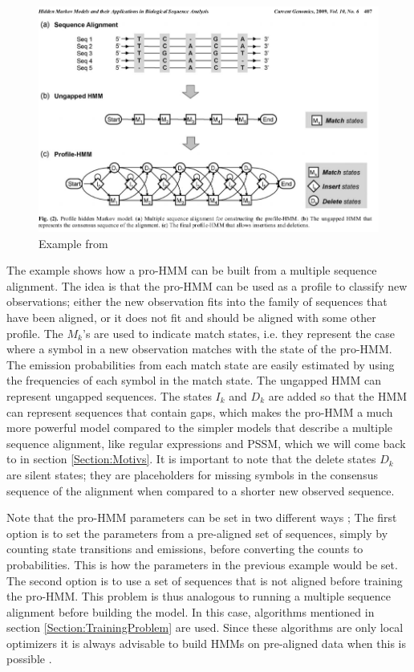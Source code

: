 \documentclass{article}\usepackage[]{graphicx}\usepackage[]{color}
\begin{document}
\begin{figure}
    \centering
    \includegraphics[width = \textwidth]{exampleProfileHMM.png}
    \caption{Example from \cite{Yoon2009}}
    \label{fig:Yoon2009ProfileHMMExample}
\end{figure}

The example shows how a pro-HMM can be built from a multiple sequence alignment. The idea is that the pro-HMM can be used as a profile to classify new observations; either the new observation fits into the family of sequences that have been aligned, or it does not fit and should be aligned with some other profile. The $M_k$'s are used to indicate match states, i.e. they represent the case where a symbol in a new observation matches with the state of the pro-HMM. The emission probabilities from each match state are easily estimated by using the frequencies of each symbol in the match state. The ungapped HMM can represent ungapped sequences. The states $I_k$ and $D_k$ are added so that the HMM can represent sequences that contain gaps, which makes the pro-HMM a much more powerful model compared to the simpler models that describe a multiple sequence alignment, like regular expressions and PSSM, which we will come back to in section \ref{Section:Motivs}. It is important to note that the delete states $D_k$ are silent states; they are placeholders for missing symbols in the consensus sequence of the alignment when compared to a shorter new observed sequence. 

Note that the pro-HMM parameters can be set in two different ways \cite{Eddy1998}; The first option is to set the parameters from a pre-aligned set of sequences, simply by counting state transitions and emissions, before converting the counts to probabilities. This is how the parameters in the previous example would be set. The second option is to use a set of sequences that is not aligned before training the pro-HMM. This problem is thus analogous to running a multiple sequence alignment before building the model. In this case, algorithms mentioned in section \ref{Section:TrainingProblem} are used. Since these algorithms are only local optimizers it is always advisable to build HMMs on pre-aligned data when this is possible \cite{Eddy1998}. 
\end{document}
